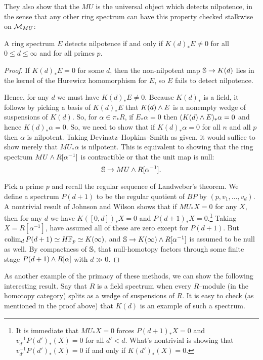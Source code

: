 They also show that the $MU$ is the universal object which detects nilpotence, in the sense that any other ring spectrum can have this property checked stalkwise on $\context{MU}$:

\begin{theorem}
A ring spectrum $E$ detects nilpotence if and only if $K(d)_* E \ne 0$ for all $0 \le d \le \infty$ and for all primes $p$.
\end{theorem}
\begin{proof}
If $K(d)_* E = 0$ for some $d$, then the non-nilpotent map $\S \to K(d)$ lies in the kernel of the Hurewicz homomorphism for $E$, so $E$ fails to detect nilpotence.

Hence, for any $d$ we must have $K(d)_* E \ne 0$.  Because $K(d)_*$ is a field, it follows by picking a basis of $K(d)_* E$ that $K(d) \sm E$ is a nonempty wedge of suspensions of $K(d)$.  So, for $\alpha \in \pi_* R$, if $E_* \alpha = 0$ then $(K(d) \sm E)_* \alpha = 0$ and hence $K(d)_* \alpha = 0$.  So, we need to show that if $K(d)_* \alpha = 0$ for all $n$ and all $p$ then $\alpha$ is nilpotent.  Taking Devinatz--Hopkins--Smith as given, it would suffice to show merely that $MU_* \alpha$ is nilpotent.  This is equivalent to showing that the ring spectrum $MU \sm R[\alpha^{-1}]$ is contractible or that the unit map is null: \[\S \to MU \sm R[\alpha^{-1}].\]

Pick a prime $p$ and recall the regular sequence of Landweber's theorem.  We define a spectrum $P(d+1)$ to be the regular quotient of $BP$ by $(p, v_1, \ldots, v_d)$.  A nontrivial result of Johnson and Wilson shows that if $MU_* X = 0$ for any $X$, then for any $d$ we have $K([0, d])_* X = 0$ and $P(d+1)_* X = 0$.\footnote{It is immediate that $MU_* X = 0$ forces $P(d+1)_* X = 0$ and $v_{d'}^{-1} P(d')_*(X) = 0$ for all $d' < d$.  What's nontrivial is showing that $v_{d'}^{-1} P(d')_*(X) = 0$ if and only if $K(d')_*(X) = 0$.}  Taking $X = R[\alpha^{-1}]$, have assumed all of these are zero except for $P(d+1)$.  But $\colim_d P(d+1) \simeq H\F_p \simeq K(\infty)$, and $\S \to K(\infty) \sm R[\alpha^{-1}]$ is assumed to be null as well.  By compactness of $\S$, that null-homotopy factors through some finite stage $P(d+1) \sm R[\alpha]$ with $d \gg 0$.
\end{proof}

As another example of the primacy of these methods, we can show the following interesting result.  Say that $R$ is a field spectrum when every $R$--module (in the homotopy category) splits as a wedge of suspensions of $R$.  It is easy to check (as mentioned in the proof above) that $K(d)$ is an example of such a spectrum.

